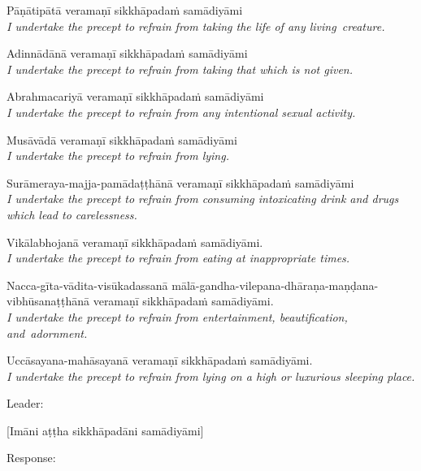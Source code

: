 {\raggedright

\begin{packedenumerate}
  \item Pāṇātipātā veramaṇī sikkhāpadaṁ samādiyāmi\\
  \emph{I undertake the precept to refrain from taking the life of any living~creature.}
  \item Adinnādānā veramaṇī sikkhāpadaṁ samādiyāmi\\
  \emph{I undertake the precept to refrain from taking that which is not given.}
  \item Abrahmacariyā veramaṇī sikkhāpadaṁ samādiyāmi\\
  \emph{I undertake the precept to refrain from any intentional sexual activity.}
  \item Musāvādā veramaṇī sikkhāpadaṁ samādiyāmi\\
  \emph{I undertake the precept to refrain from lying.}
  \item Surāmeraya-majja-pamādaṭṭhānā veramaṇī sikkhāpadaṁ samādiyāmi\\
  \emph{I undertake the precept to refrain from consuming intoxicating drink and drugs which lead to carelessness.}
  \item Vikālabhojanā veramaṇī sikkhāpadaṁ samādiyāmi.\\
  \emph{I undertake the precept to refrain from eating at inappropriate times.}
  \item Nacca-gīta-vādita-visūkadassanā mālā-gandha-vilepana-dhāraṇa-maṇḍana-vibhūsanaṭṭhānā veramaṇī sikkhāpadaṁ samādiyāmi.\\
  \emph{I undertake the precept to refrain from entertainment, beautification, and~adornment.}
  \item Uccāsayana-mahāsayanā veramaṇī sikkhāpadaṁ samādiyāmi.\\
  \emph{I undertake the precept to refrain from lying on a high or luxurious sleeping place.}
\end{packedenumerate}

}


\begin{instruction}
  Leader:
\end{instruction}

[Imāni aṭṭha sikkhāpadāni samādiyāmi]

\begin{instruction}
  Response:
\end{instruction}

